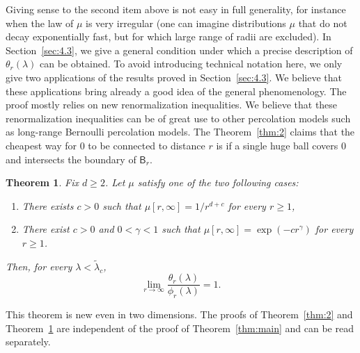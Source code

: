 \documentclass[10pt]{amsart}
\newtheorem{theo}{Theorem}[section]
\theoremstyle{definition}\newtheorem{defi}[theo]{Definition}\newtheorem{rema}[theo]{Remark}\newtheorem{exam}[theo]{Example}\newtheorem{exem}[theo]{Example}\newtheorem{nota}[theo]{Notation}
\newcommand*{\cenumi}{\renewcommand*{\theenumi}{C\arabic{enumi}}}
\begin{document}
Giving sense to the second item above is not easy in full generality, for instance when the law of $\mu$ is very irregular (one can imagine distributions $\mu$ that do not decay exponentially fast, but for which large range of radii are excluded). In Section~\ref{sec:4.3}, we give a general condition under which a precise description of $\theta_r(\lambda)$ can be obtained. To avoid introducing technical notation here, we only give two applications of the results proved in Section~\ref{sec:4.3}. We believe that these applications bring already a good idea of the general phenomenology. The proof mostly relies on new renormalization inequalities. We believe that these renormalization inequalities can be of great use to other percolation models such as long-range Bernoulli percolation models. The Theorem~\ref{thm:2} claims that the cheapest way for 0 to be connected to distance $r$ is if a single huge ball covers 0 and intersects the boundary of $\mathsf B_r$.

\begin{theo}\label{thm:3}
Fix $d\ge2$. Let $\mu$ satisfy one of the two following cases:
\begin{enumerate}\cenumi
\item\label{C1}
There exists $c>0$ such that $\mu[r,\infty]=1/r^{d+c}$ for every $r\ge 1$,
\item\label{C2}
There exist $c>0$ and $0<\gamma<1$ such that $\mu[r,\infty]=\exp(-cr^{\gamma})$ for every $r\ge1$.
\end{enumerate}
Then, for every $\lambda<\widetilde\lambda_c$,
\[
\lim_{r\rightarrow\infty}\frac{\theta_r(\lambda)}{\phi_r(\lambda)}=1.
\]
\end{theo}

This theorem is new even in two dimensions. The proofs of Theorem~\ref{thm:2} and Theorem~\ref{thm:3} are independent of the proof of Theorem~\ref{thm:main} and can be read separately.
\end{document}
